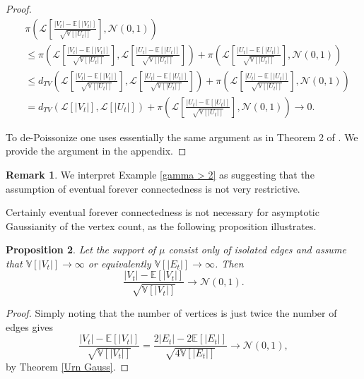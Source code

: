\documentclass[12pt]{article}
\newtheorem{proposition}{Proposition}
\theoremstyle{definition}
\newtheorem{remark}[proposition]{Remark}
\begin{document}
\begin{proof}
\begin{align*}
    &\pi\left(\mathcal{L}\left[\frac{|V_t|-\mathbb{E}[|V_t|]}{\sqrt{\mathbb{V}[|U_t|]}}\right], \mathcal{N}(0,1)\right) \\ 
    &\leq \pi\left(\mathcal{L}\left[\frac{|V_t|-\mathbb{E}[|V_t|]}{\sqrt{\mathbb{V}[|U_t|]}}\right], \mathcal{L}\left[\frac{|U_t|-\mathbb{E}[|U_t|]}{\sqrt{\mathbb{V}[|U_t|]}}\right] \right) +\pi\left(\mathcal{L}\left[\frac{|U_t|-\mathbb{E}[|U_t|]}{\sqrt{\mathbb{V}[|U_t|]}}\right], \mathcal{N}(0,1)\right) \\ 
    &\leq d_{TV}\left(\mathcal{L}\left[\frac{|V_t|-\mathbb{E}[|V_t|]}{\sqrt{\mathbb{V}[|U_t|]}}\right], \mathcal{L}\left[\frac{|U_t|-\mathbb{E}[|U_t|]}{\sqrt{\mathbb{V}[|U_t|]}}\right] \right) +\pi\left(\mathcal{L}\left[\frac{|U_t|-\mathbb{E}[|U_t|]}{\sqrt{\mathbb{V}[|U_t|]}}\right], \mathcal{N}(0,1)\right) \\
    &= d_{TV}\left(\mathcal{L}[|V_t|],\mathcal{L}[|U_t|]\right)  +\pi\left(\mathcal{L}\left[\frac{|U_t|-\mathbb{E}[|U_t|]}{\sqrt{\mathbb{V}[|U_t|]}}\right], \mathcal{N}(0,1)\right) \rightarrow 0.
    \end{align*}

To de-Poissonize one uses essentially the same argument as in Theorem 2 of \cite{dutko_1989_central}. We provide the argument in the appendix.
\end{proof}
\begin{remark}\label{connected not very restrictive}
    We interpret Example \ref{gamma > 2} as suggesting that the assumption of eventual forever connectedness is not very restrictive.
\end{remark}

Certainly eventual forever connectedness is not necessary for asymptotic Gaussianity of the vertex count, as the following proposition illustrates.

\begin{proposition} \label{sparse Gaussian} Let the support of $\mu$ consist only of isolated edges and assume that $\mathbb{V}[|V_t|] \rightarrow \infty$ or equivalently $\mathbb{V}[|E_t|] \rightarrow \infty$. Then
$$\frac{|V_t|-\mathbb{E}[|V_t|]}{\sqrt{\mathbb{V}[|V_t|]}} \rightarrow \mathcal{N}(0,1).$$
\end{proposition}
\begin{proof}
Simply noting that the number of vertices is just twice the number of edges gives
$$\frac{|V_t|-\mathbb{E}[|V_t|]}{\sqrt{\mathbb{V}[|V_t|]}} = \frac{2|E_t|-2\mathbb{E}[|E_t|]}{\sqrt{4\mathbb{V}[|E_t|]}} \rightarrow \mathcal{N}(0,1),$$ by Theorem \ref{Urn Gauss}.
\end{proof}
\end{document}

